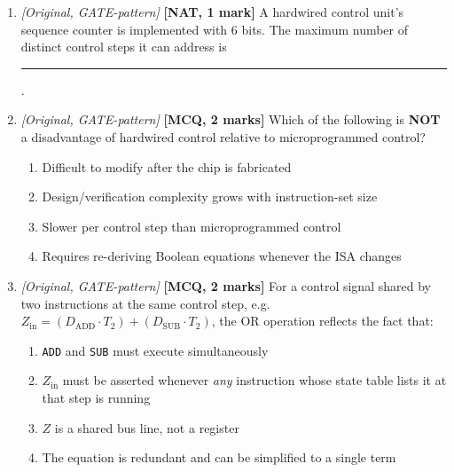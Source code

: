 \documentclass[11pt]{article}
\begin{document}
\begin{enumerate}
\item[\textbf{Q5}] \textit{[Original, GATE-pattern]} \textbf{[NAT, 1 mark]} A hardwired control unit's sequence counter is implemented with 6 bits. The maximum number of distinct control steps it can address is \rule{1.5cm}{0.4pt}.

\item[\textbf{Q6}] \textit{[Original, GATE-pattern]} \textbf{[MCQ, 2 marks]} Which of the following is \textbf{NOT} a disadvantage of hardwired control relative to microprogrammed control?
\begin{enumerate}
  \item[(A)] Difficult to modify after the chip is fabricated
  \item[(B)] Design/verification complexity grows with instruction-set size
  \item[(C)] Slower per control step than microprogrammed control
  \item[(D)] Requires re-deriving Boolean equations whenever the ISA changes
\end{enumerate}

\item[\textbf{Q7}] \textit{[Original, GATE-pattern]} \textbf{[MCQ, 2 marks]} For a control signal shared by two instructions at the same control step, e.g.\ $Z_{\text{in}} = (D_{\text{ADD}} \cdot T_2) + (D_{\text{SUB}} \cdot T_2)$, the OR operation reflects the fact that:
\begin{enumerate}
  \item[(A)] \texttt{ADD} and \texttt{SUB} must execute simultaneously
  \item[(B)] $Z_{\text{in}}$ must be asserted whenever \emph{any} instruction whose state table lists it at that step is running
  \item[(C)] $Z$ is a shared bus line, not a register
  \item[(D)] The equation is redundant and can be simplified to a single term
\end{enumerate}

\end{enumerate}
\end{document}
